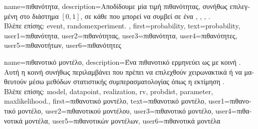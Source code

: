 {name={\foreignlanguage{greek}{πιθανότητα}},
	description={\foreignlanguage{greek}{Αποδίδουμε} \foreignlanguage{greek}{μία τιμή 
		πιθανότητας, συνήθως επιλεγμένη στο διάστημα $[0,1]$, σε κάθε}  
		\foreignlanguage{greek}{που μπορεί να συμβεί σε ένα}  
		\cite{BillingsleyProbMeasure}, \cite{BertsekasProb}, \cite{HalmosMeasure}, \cite{KallenbergBook}. \\
		\foreignlanguage{greek}{Βλέπε επίσης:} \gls{event}, \gls{randomexperiment}. },
	first={probability},
	text={probability},
	user1={\foreignlanguage{greek}{πιθανότητα}}, %
    	user2={\foreignlanguage{greek}{πιθανότητας}}, %
	user3={\foreignlanguage{greek}{πιθανότητα}}, %
	user4={\foreignlanguage{greek}{πιθανότητες}}, %
    	user5={\foreignlanguage{greek}{πιθανοτήτων}}, %
	user6={\foreignlanguage{greek}{πιθανότητες}} %
}

{name={\foreignlanguage{greek}{πιθανοτικό μοντέλο}},
	description={\foreignlanguage{greek}{Ένα πιθανοτικό}  
		\foreignlanguage{greek}{ερμηνεύει}  \foreignlanguage{greek}{ως}
		  \foreignlanguage{greek}{με κοινή} . \foreignlanguage{greek}{Αυτή η κοινή} 
		 \foreignlanguage{greek}{συνήθως περιλαμβάνει} 
		 \foreignlanguage{greek}{που πρέπει να επιλεχθούν χειρωνακτικά ή να μαθευτούν μέσω μεθόδων στατιστικής  
		συμπερασματολογίας όπως η εκτίμηση}   \cite{LC}.\\
		\foreignlanguage{greek}{Βλέπε επίσης:} \gls{model}, \gls{datapoint}, \gls{realization}, \gls{rv}, \gls{probdist}, \gls{parameter}, \gls{maxlikelihood}.}, 
	first={\foreignlanguage{greek}{πιθανοτικό μοντέλο}}, 
	text={\foreignlanguage{greek}{πιθανοτικό μοντέλο}},
	user1={\foreignlanguage{greek}{πιθανοτικό μοντέλο}}, %
   	user2={\foreignlanguage{greek}{πιθανοτικού μοντέλου}}, %
	user3={\foreignlanguage{greek}{πιθανοτικό μοντέλο}}, %
	user4={\foreignlanguage{greek}{πιθανοτικά μοντέλα}}, %
   	user5={\foreignlanguage{greek}{πιθανοτικών μοντέλων}}, %
	user6={\foreignlanguage{greek}{πιθανοτικά μοντέλα}} %
}

